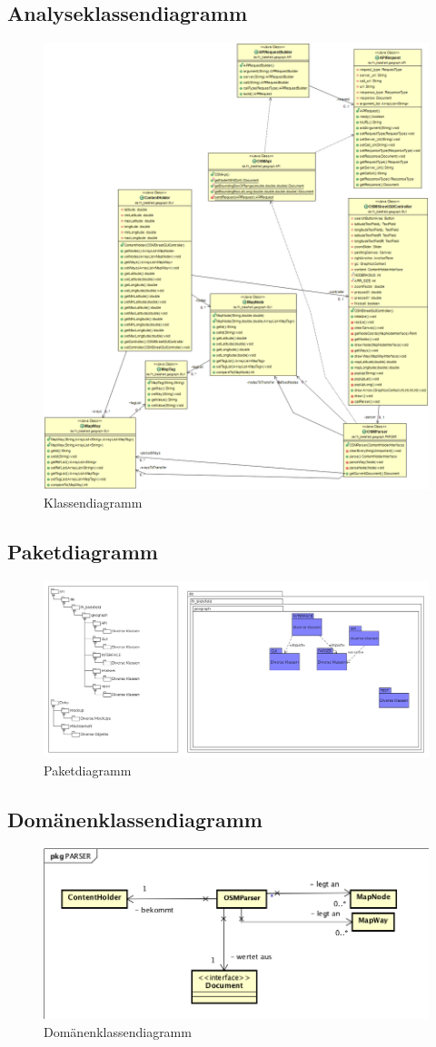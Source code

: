 	\subsection{Analyseklassendiagramm}	
		\begin{figure}[H]
		\centering
		\includegraphics[width=0.7\linewidth]{images/Klassendiagramm_v2}
		\caption{Klassendiagramm}
		\label{fig:Klassendiagramm}
	\end{figure}
	\subsection{Paketdiagramm}
		\begin{figure}[H]
			\centering
			\includegraphics[width=0.7\linewidth]{images/Paketdiagramm}
			\caption{Paketdiagramm}
			\label{fig:Paketdiagramm}
		\end{figure}
	\subsection{Domänenklassendiagramm}
		\begin{figure}[H]
			\centering
			\includegraphics[width=0.7\linewidth]{images/DomaenenKlassendiagramm_v3}
			\caption{Domänenklassendiagramm}
			\label{fig:Domänenklassendiagramm}
		\end{figure}
